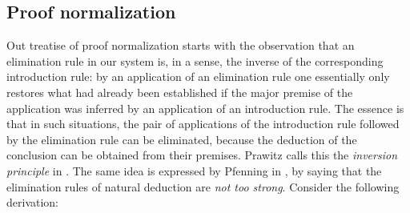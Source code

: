 
\subsection{Proof normalization}


Out treatise of proof normalization starts with the observation that an
elimination rule in our system is, in a sense, the inverse of the corresponding
introduction rule: by an application of an elimination rule one essentially only
restores what had already been established if the major premise of the
application was inferred by an application of an introduction rule. The essence
is that in such situations, the pair of applications of the introduction rule
followed by the elimination rule can be eliminated, because the deduction of the
conclusion can be obtained from their premises. Prawitz calls this the
\emph{inversion principle} in \cite{prawitz1965}. The same idea is expressed by
Pfenning in \cite{pfenninglecturescl}, by saying that the elimination rules of
natural deduction are \emph{not too strong}. Consider the following derivation:

